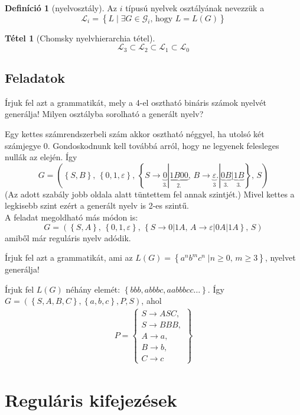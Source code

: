 \documentclass[a4paper,12pt]{article}
\theoremstyle{definition}
\newtheorem*{definition*}{Definíció}
\newtheorem{theorem}{Tétel}
\begin{document}
	\begin{definition*}[nyelvosztály]
		Az $i$ típusú nyelvek osztályának nevezzük a 
		\[
		\mathcal{L}_i = \left\lbrace L \; | \; \exists G \in \mathcal{G}_i \text{, hogy } L = L(G) \right\rbrace 
		\]
	\end{definition*}
	
	\begin{theorem}[Chomsky nyelvhierarchia tétel]
		\[
			\mathcal{L}_3 \subset \mathcal{L}_2 \subset \mathcal{L}_1 \subset \mathcal{L}_0
		\]
	\end{theorem}
	
	\subsection{Feladatok}
	\setcounter{question}{0}
	\begin{question}
		Írjuk fel azt a grammatikát, mely a 4-el osztható bináris számok nyelvét generálja! Milyen osztályba sorolható a generált nyelv?
	\end{question}

	\begin{solution}
		Egy kettes számrendszerbeli szám akkor osztható néggyel, ha utolsó két számjegye 0. Gondoskodnunk kell továbbá arról, hogy ne legyenek felesleges nullák az elején. Így
		\[
		G = \left( \left\lbrace S, B \right\rbrace, \, \left\lbrace 0,1, \varepsilon \right\rbrace, \, \left\lbrace  S \rightarrow \underbrace{0}_{3.} | \underbrace{1B00}_{2.}, \,  B \rightarrow \underbrace{\varepsilon}_3.|\underbrace{0B}_{3.}|\underbrace{1B}_{3.} \right\rbrace , \, S \right)
		\]
		(Az adott szabály jobb oldala alatt tüntettem fel annak szintjét.) Mivel kettes a legkisebb szint ezért a generált nyelv is 2-es szintű.
		\\[4pt]
		A feladat megoldható más módon is:
		\[
		G = \left( \left\lbrace S, A \right\rbrace, \, \left\lbrace 0,1, \varepsilon \right\rbrace, \, \left\lbrace  S \rightarrow 0 | 1A, \,  A \rightarrow \varepsilon|0A|1A \right\rbrace , \, S \right)
		\]
		amiből már reguláris nyelv adódik.
	\end{solution}

	\begin{question}
		Írjuk fel azt a grammatikát, ami az $ L(G) = \left\lbrace a^n b^m c^n \; | n \ge 0, \, m \ge 3 \right\rbrace  $, nyelvet generálja!
	\end{question}
	\begin{solution}
		Írjuk fel $L(G)$ néhány elemét: $ \left\lbrace bbb, abbbc, aabbbcc \dots \right\rbrace $. Így $ G = (\left\lbrace  S,A,B,C \right\rbrace , \left\lbrace a,b,c \right\rbrace, P, S) $, ahol
		\begin{align*}
			P = \left\lbrace \begin{array}{l}
				S \rightarrow ASC, \\
				S \rightarrow BBB, \\
				A \rightarrow a, \\
				B \rightarrow b, \\
				C \rightarrow c
			\end{array} \right\rbrace 
		\end{align*}
	\end{solution}
	
	\section{Reguláris kifejezések}

	
\end{document}
